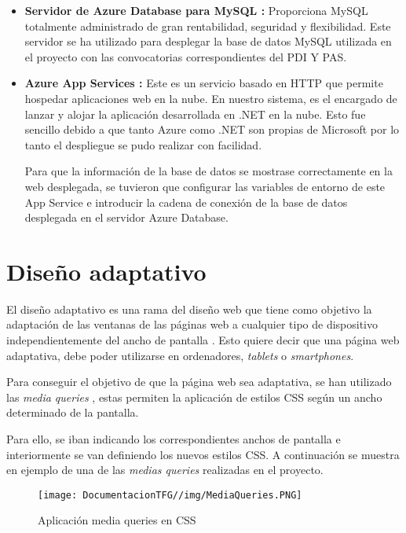 \begin{itemize}
    \item \textbf{Servidor de Azure Database para MySQL \cite{azuremysql:latex}:} Proporciona MySQL totalmente administrado de gran rentabilidad, seguridad y flexibilidad. Este servidor se ha utilizado para desplegar la base de datos MySQL utilizada en el proyecto con las convocatorias correspondientes del PDI Y PAS.
     \item \textbf{Azure App Services \cite{azureappservices:latex}:} Este es un servicio basado en HTTP que permite hospedar aplicaciones web en la nube. En nuestro sistema, es el encargado de lanzar y alojar la aplicación desarrollada en .NET en la nube. Esto fue sencillo debido a que tanto Azure como .NET son propias de Microsoft por lo tanto el despliegue se pudo realizar con facilidad.
     
     Para que la información de la base de datos se mostrase correctamente en la web desplegada, se tuvieron que configurar las variables de entorno de este App Service e introducir la cadena de conexión de la base de datos desplegada en el servidor Azure Database.
\end{itemize}


\section{Diseño adaptativo}

El diseño adaptativo es una rama del diseño web que tiene como objetivo la adaptación de las ventanas de las páginas web a cualquier tipo de dispositivo independientemente del ancho de pantalla \cite{adaptativo:latex}. Esto quiere decir que una página web adaptativa, debe poder utilizarse en ordenadores, \textit{tablets} o \textit{smartphones}. 

Para conseguir el objetivo de que la página web sea adaptativa, se han utilizado las \textit{media queries} \cite{mediaqueries:latex}, estas permiten la aplicación de estilos CSS según un ancho determinado de la pantalla.

Para ello, se iban indicando los correspondientes anchos de pantalla e interiormente se van definiendo los nuevos estilos CSS. A continuación se muestra en ejemplo de una de las \textit{medias queries} realizadas en el proyecto.

\begin{figure}[H]
    \centering
    \texttt{[image: DocumentacionTFG//img/MediaQueries.PNG]}
    \caption{Aplicación media queries en CSS}
\end{figure}

